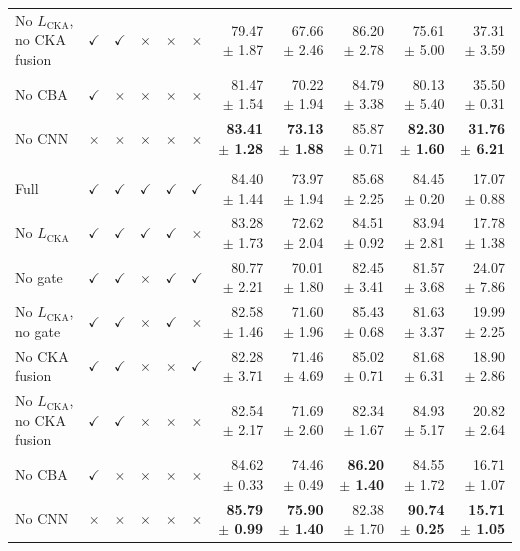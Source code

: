 \documentclass[10pt]{article}
\begin{document}
{\begin{longtable}{lccccc rrrrr}
No $L_{\mathrm{CKA}}$, no CKA fusion & $\checkmark$ & $\checkmark$ & $\times$ & $\times$ & $\times$ & 79.47 $\pm$ 1.87 & 67.66 $\pm$ 2.46 & 86.20 $\pm$ 2.78 & 75.61 $\pm$ 5.00 & 37.31 $\pm$ 3.59 \\
No CBA & $\checkmark$ & $\times$ & $\times$ & $\times$ & $\times$ & 81.47 $\pm$ 1.54 & 70.22 $\pm$ 1.94 & 84.79 $\pm$ 3.38 & 80.13 $\pm$ 5.40 & 35.50 $\pm$ 0.31 \\
No CNN & $\times$ & $\times$ & $\times$ & $\times$ & $\times$ & \textbf{83.41 $\pm$ 1.28} & \textbf{73.13 $\pm$ 1.88} & 85.87 $\pm$ 0.71 & \textbf{82.30 $\pm$ 1.60} & \textbf{31.76 $\pm$ 6.21} \\
\addlinespace[4pt]
\multicolumn{11}{l}{\textit{Source: USOVA $\rightarrow$ Target: OTU}} \\
\midrule
Full & $\checkmark$ & $\checkmark$ & $\checkmark$ & $\checkmark$ & $\checkmark$ & 84.40 $\pm$ 1.44 & 73.97 $\pm$ 1.94 & 85.68 $\pm$ 2.25 & 84.45 $\pm$ 0.20 & 17.07 $\pm$ 0.88 \\
No $L_{\mathrm{CKA}}$ & $\checkmark$ & $\checkmark$ & $\checkmark$ & $\checkmark$ & $\times$ & 83.28 $\pm$ 1.73 & 72.62 $\pm$ 2.04 & 84.51 $\pm$ 0.92 & 83.94 $\pm$ 2.81 & 17.78 $\pm$ 1.38 \\
No gate & $\checkmark$ & $\checkmark$ & $\times$ & $\checkmark$ & $\checkmark$ & 80.77 $\pm$ 2.21 & 70.01 $\pm$ 1.80 & 82.45 $\pm$ 3.41 & 81.57 $\pm$ 3.68 & 24.07 $\pm$ 7.86 \\
No $L_{\mathrm{CKA}}$, no gate & $\checkmark$ & $\checkmark$ & $\times$ & $\checkmark$ & $\times$ & 82.58 $\pm$ 1.46 & 71.60 $\pm$ 1.96 & 85.43 $\pm$ 0.68 & 81.63 $\pm$ 3.37 & 19.99 $\pm$ 2.25 \\
No CKA fusion & $\checkmark$ & $\checkmark$ & $\times$ & $\times$ & $\checkmark$ & 82.28 $\pm$ 3.71 & 71.46 $\pm$ 4.69 & 85.02 $\pm$ 0.71 & 81.68 $\pm$ 6.31 & 18.90 $\pm$ 2.86 \\
No $L_{\mathrm{CKA}}$, no CKA fusion & $\checkmark$ & $\checkmark$ & $\times$ & $\times$ & $\times$ & 82.54 $\pm$ 2.17 & 71.69 $\pm$ 2.60 & 82.34 $\pm$ 1.67 & 84.93 $\pm$ 5.17 & 20.82 $\pm$ 2.64 \\
No CBA & $\checkmark$ & $\times$ & $\times$ & $\times$ & $\times$ & 84.62 $\pm$ 0.33 & 74.46 $\pm$ 0.49 & \textbf{86.20 $\pm$ 1.40} & 84.55 $\pm$ 1.72 & 16.71 $\pm$ 1.07 \\
No CNN & $\times$ & $\times$ & $\times$ & $\times$ & $\times$ & \textbf{85.79 $\pm$ 0.99} & \textbf{75.90 $\pm$ 1.40} & 82.38 $\pm$ 1.70 & \textbf{90.74 $\pm$ 0.25} & \textbf{15.71 $\pm$ 1.05} \\

\end{longtable}}
\end{document}
